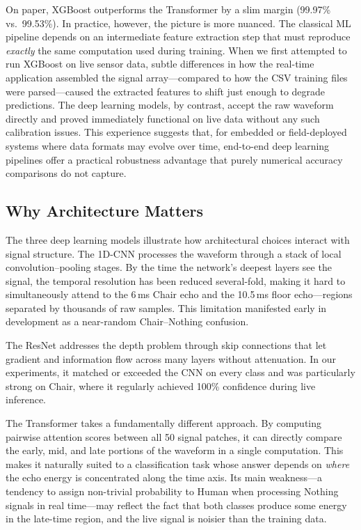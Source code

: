 \documentclass[conference,a4paper]{IEEEtran}
\begin{document}
On paper, XGBoost outperforms the Transformer by a slim margin (99.97\% vs.\ 99.53\%). In practice, however, the picture is more nuanced. The classical ML pipeline depends on an intermediate feature extraction step that must reproduce \emph{exactly} the same computation used during training. When we first attempted to run XGBoost on live sensor data, subtle differences in how the real-time application assembled the signal array---compared to how the CSV training files were parsed---caused the extracted features to shift just enough to degrade predictions. The deep learning models, by contrast, accept the raw waveform directly and proved immediately functional on live data without any such calibration issues. This experience suggests that, for embedded or field-deployed systems where data formats may evolve over time, end-to-end deep learning pipelines offer a practical robustness advantage that purely numerical accuracy comparisons do not capture.

\subsection{Why Architecture Matters}

The three deep learning models illustrate how architectural choices interact with signal structure. The 1D-CNN processes the waveform through a stack of local convolution--pooling stages. By the time the network's deepest layers see the signal, the temporal resolution has been reduced several-fold, making it hard to simultaneously attend to the 6\,ms Chair echo and the 10.5\,ms floor echo---regions separated by thousands of raw samples. This limitation manifested early in development as a near-random Chair--Nothing confusion.

The ResNet addresses the depth problem through skip connections that let gradient and information flow across many layers without attenuation. In our experiments, it matched or exceeded the CNN on every class and was particularly strong on Chair, where it regularly achieved 100\% confidence during live inference.

The Transformer takes a fundamentally different approach. By computing pairwise attention scores between all 50 signal patches, it can directly compare the early, mid, and late portions of the waveform in a single computation. This makes it naturally suited to a classification task whose answer depends on \emph{where} the echo energy is concentrated along the time axis. Its main weakness---a tendency to assign non-trivial probability to Human when processing Nothing signals in real time---may reflect the fact that both classes produce some energy in the late-time region, and the live signal is noisier than the training data.
\end{document}
